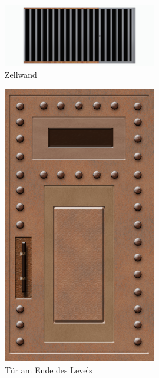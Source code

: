 \documentclass[12pt]{article}
\begin{document}
\begin{figure}
	\centering
	\includegraphics[width=0.6\textwidth]{zellwand}
	\caption{Zellwand
		\label{fig:prisonwall}}
\end{figure}

\begin{figure}
	\centering
	\includegraphics[width=0.6\textwidth]{door}
	\caption{Tür am Ende des Levels
		\label{fig:door}}
\end{figure}
\end{document}
